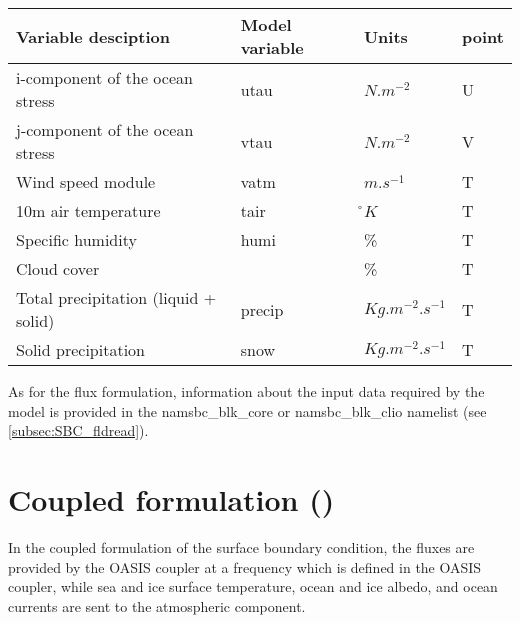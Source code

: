 \documentclass[../main/NEMO_manual]{subfiles}
\begin{document}
\begin{table}[htbp]
  \label{tab:CLIO}
  \begin{center}
    \begin{tabular}{|l|l|l|l|}
      \hline
      Variable desciption				& Model variable	& Units				& point \\	\hline
      i-component of the ocean stress		& utau			& $N.m^{-2}$			& U \\	\hline
      j-component of the ocean stress		& vtau			& $N.m^{-2}$			& V \\	\hline
      Wind speed module					& vatm			& $m.s^{-1}$			& T \\	\hline
      10m air temperature					& tair			& \r{}$K$				& T \\	\hline
      Specific humidity						& humi			& \%					& T \\	\hline
      Cloud cover							& 				& \%					& T \\	\hline
      Total precipitation (liquid + solid)	& precip		& $Kg.m^{-2}.s^{-1}$	& T \\	\hline
      Solid precipitation 					& snow			& $Kg.m^{-2}.s^{-1}$	& T \\	\hline
    \end{tabular}
  \end{center}
\end{table}

As for the flux formulation, information about the input data required by the model is provided in
the namsbc\_blk\_core or namsbc\_blk\_clio namelist (see \autoref{subsec:SBC_fldread}). 

\section{Coupled formulation (\protect{})}
\label{sec:SBC_cpl}


In the coupled formulation of the surface boundary condition,
the fluxes are provided by the OASIS coupler at a frequency which is defined in the OASIS coupler,
while sea and ice surface temperature, ocean and ice albedo, and ocean currents are sent to
the atmospheric component.
\end{document}
